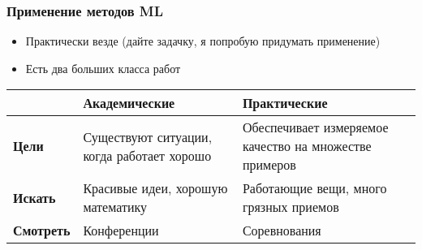 \documentclass[14pt, fleqn, xcolor={dvipsnames, table}]{beamer}
\begin{document}
\begin{frame}
\frametitle{Применение методов ML}
\begin{itemize}
\item Практически везде (дайте задачку, я попробую придумать применение)
\item Есть два больших класса работ
\end{itemize}
\begin{center}
\footnotesize
\begin{tabular}{p{}|p{}|p{}}
\rowcolor{Blue!20}
& \small Академические & \small Практические \\
\hline 
\bf Цели & Существуют ситуации, когда работает хорошо & Обеспечивает измеряемое качество на множестве примеров \\
\bf Искать & Красивые идеи, хорошую математику & Работающие вещи, много грязных приемов \\
\bf Смотреть & Конференции & Соревнования \\
\end{tabular}
\end{center}
\end{frame}
\end{document}
